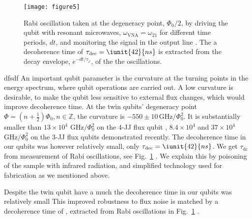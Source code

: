  \begin{figure}[h!]
   \texttt{[image: figure5]}
   \caption{Rabi  oscillation taken  at the  degeneracy point,  $ \Phi_0/2  $, by
     driving        the       qubit        with       resonant        microwaves,
     $\omega_{\text{VNA}} = \omega_{21}$ for different  time periods, $ dt $, and
     monitoring the  signal in  the output line  \cite{rabi}.  The  a decoherence
     time of $  \tau_{\text{dec}} = \iunit{42}{ns} $ is extracted  from the decay
     envelope,      $      e^{-dt/\tau_\varphi}      $,      of      the      the
     oscillations. \label{fig:rabi}}
 \end{figure}
 dfsdf An important qubit parameter is the curvature at the turning points in the
 energy spectrum,  where qubit operations  are carried  out.  A low  curvature is
 desirable, to  make the  qubit less  sensitive to  external flux  changes, which
 would  improve  decoherence   time.   At  the  twin   qubits'  degeneracy  point
 $  \Phi  =   (n  +  \frac{1}{2})\Phi_0,  n\in\mathbb{Z}  $,   the  curvature  is
 $   -550\pm10\,\text{GHz}/\Phi_0^2  $.    It  is   substantially  smaller   than
 $ 13\times 10^4$ $ \text{GHz}/\Phi_0^2$ on the 4-JJ flux qubit \cite{stern2014},
 $ 8.4 \times 10^4$ \cite{zhu2010}  and $ 37\times 10^{4}$ $ \text{GHz}/\Phi_0^2$
 \cite{gustavsson2012}  on  the  3-JJ  flux qubits  demonstrated  recently.   The
 decoherence   time  in   our   qubits  was   however   relatively  small,   only
 $ \tau_\text{dec} = \iunit{42}{ns} $.   We get $\tau_\text{dc}$ from measurement
 of Rabi oscillations,  see Fig.~\ref{fig:rabi} \cite{rabi}.  We  explain this by
 poisoning of the sample with  infrared radiation, and simplified technology used
 for fabrication as we mentioned above.

 Despite  the twin  qubit have  a much  the decoherence  time in  our qubits  was
 relatively  small  This improved  robustness  to  flux  noise  is matched  by  a
 decoherence time  of , extracted  from Rabi oscillations  in Fig.~\ref{fig:rabi}
 \cite{rabi}.

